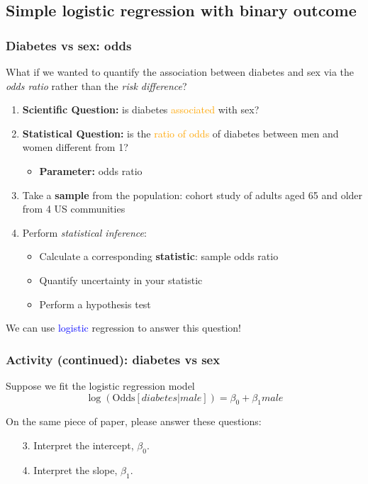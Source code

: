 \documentclass[12pt, 
hyperref={colorlinks=true, linkcolor=blue, urlcolor=cyan}]{beamer}
\begin{document}
\subsection{Simple logistic regression with binary outcome}
\begin{frame}
\frametitle{Diabetes vs sex: odds}
\begin{small} What if we wanted to quantify the association between diabetes and sex via the \textit{odds ratio} rather than the \textit{risk difference}? \end{small} \pause

\vspace{-0.3cm}

\begin{enumerate}
\item \textbf{Scientific Question:} is diabetes \textcolor{orange}{associated} with sex? \pause
\item \textbf{Statistical Question:} is the \textcolor{orange}{ratio of odds} of diabetes between men and women different from 1? \pause
	\begin{itemize}
	\item \textbf{Parameter:} odds ratio \pause
	\end{itemize}
\item Take a \textbf{sample} from the population: cohort study of adults aged 65 and older from 4 US communities \pause
\item Perform \textit{statistical inference}:
	\begin{itemize}
	\item Calculate a corresponding \textbf{statistic}: sample odds ratio
	\item Quantify uncertainty in your statistic
	\item Perform a hypothesis test \pause
	\end{itemize}
\end{enumerate}

\vspace{-0.4cm}
We can use \textcolor{blue}{logistic} regression to answer this question!
\end{frame}

\begin{frame}
\frametitle{Activity (continued): diabetes vs sex}
Suppose we fit the logistic regression model $$\log\left(\text{Odds}[diabetes | male]\right) = \beta_0 + \beta_1 male$$

\color{blue} On the same piece of paper, please answer these questions:

\begin{enumerate}
\item[3.] \color{blue} Interpret the intercept, $\beta_0$.
\item[4.] Interpret the slope, $\beta_1$.
\end{enumerate}
\end{frame}
\end{document}
